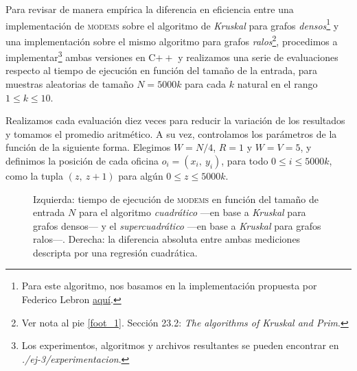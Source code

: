 

Para revisar de manera empírica la diferencia en eficiencia entre una implementación de \textsc{modems} sobre el algoritmo de \textit{Kruskal} para grafos \textit{densos}\footnote{Para este algoritmo, nos basamos en la implementación propuesta por Federico Lebron \href{https://fedelebron.com/a-dense-version-of-kruskals-algorithm}{\color{blue} aquí}.} y una implementación sobre el mismo algoritmo para grafos \textit{ralos}\footnote{Ver nota al pie \ref{foot_1}. Sección 23.2: \textit{The algorithms of Kruskal and Prim}.}, procedimos a implementar\footnote{Los experimentos, algoritmos y archivos resultantes se pueden encontrar en \textit{./ej-3/experimentacion}.} ambas versiones en C$++$ y realizamos una serie de evaluaciones respecto al tiempo de ejecución en función del tamaño de la entrada, para muestras aleatorias de tamaño $N = 5000k$ para cada $k$ natural en el rango $1 \leq k \leq 10$. 

Realizamos cada evaluación diez veces para reducir la variación de los resultados y tomamos el promedio aritmético. 
A su vez, controlamos los parámetros de la función de la siguiente forma. Elegimos \mbox{$W = N/4$}, $R = 1$ y $W = V = 5$, y definimos la posición de cada oficina $o_i = (x_i,\ y_i)$, para todo $0 \leq i \leq 5000k$, como la tupla $(z,\ z+1)$ para algún $0 \leq z \leq 5000k$. 

\begin{figure}[!htbp]

    \caption{Izquierda: tiempo de ejecución de \textsc{modems} en función del tamaño de entrada $N$ para el algoritmo \textit{cuadrático} ---en base a \textit{Kruskal} para grafos densos--- y el \textit{supercuadrático} ---en base a \textit{Kruskal} para grafos ralos---. Derecha: la diferencia absoluta entre ambas mediciones descripta por una regresión cuadrática.}
    \label{grafico_1}
\end{figure}

